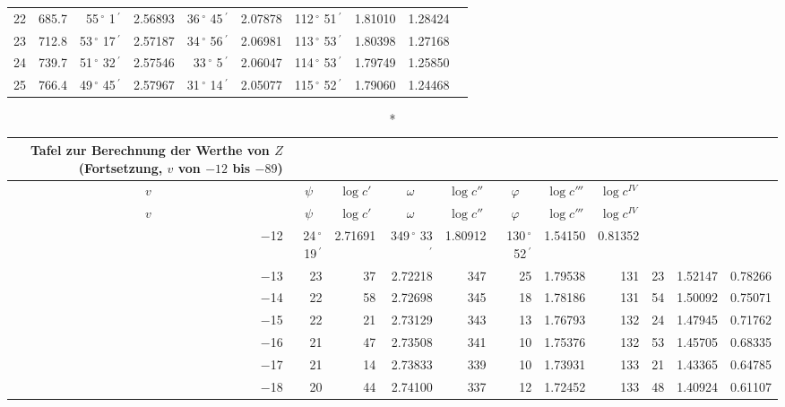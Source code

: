 \documentclass[12pt,a4paper]{article}
\newcommand{\Grad}{\,^\circ}
\newcommand{\Min}{\,^\prime}
\begin{document}
\begin{small}
\begin{longtable}{@{}rr|rr|rr|rr|rr@{}}
22 & 685.7 & 55$\Grad$ 1$\Min$ & 2.56893 & 36$\Grad$ 45$\Min$ & 2.07878 & 112$\Grad$ 51$\Min$ & 1.81010 & 1.28424 \\
23 & 712.8 & 53$\Grad$ 17$\Min$ & 2.57187 & 34$\Grad$ 56$\Min$ & 2.06981 & 113$\Grad$ 53$\Min$ & 1.80398 & 1.27168 \\
24 & 739.7 & 51$\Grad$ 32$\Min$ & 2.57546 & 33$\Grad$ 5$\Min$ & 2.06047 & 114$\Grad$ 53$\Min$ & 1.79749 & 1.25850 \\
25 & 766.4 & 49$\Grad$ 45$\Min$ & 2.57967 & 31$\Grad$ 14$\Min$ & 2.05077 & 115$\Grad$ 52$\Min$ & 1.79060 & 1.24468 \\
\end{longtable}
\end{small}

\newpage

\begin{small}
\noindent\begin{longtable}{@{}r|rr|rr|rr|rr|rr@{}}
\caption*{Tafel zur Berechnung der Werthe von $Z$ (Fortsetzung, $v$ von $-12$ bis $-89$)}\\
\toprule
\multicolumn{1}{c}{$v$} &
\multicolumn{1}{c}{$\psi$} & \multicolumn{1}{c}{$\log c'$} &
\multicolumn{1}{c}{$\omega$} & \multicolumn{1}{c}{$\log c''$} &
\multicolumn{1}{c}{$\varphi$} & \multicolumn{1}{c}{$\log c'''$} &
\multicolumn{1}{c}{$\log c^{IV}$} \\
\midrule
\endfirsthead
\toprule
\multicolumn{1}{c}{$v$} &
\multicolumn{1}{c}{$\psi$} & \multicolumn{1}{c}{$\log c'$} &
\multicolumn{1}{c}{$\omega$} & \multicolumn{1}{c}{$\log c''$} &
\multicolumn{1}{c}{$\varphi$} & \multicolumn{1}{c}{$\log c'''$} &
\multicolumn{1}{c}{$\log c^{IV}$} \\
\midrule
\endhead
\bottomrule
\endfoot
$-$12 & 24$\Grad$ 19$\Min$ & 2.71691 & 349$\Grad$ 33$\Min$ & 1.80912 & 130$\Grad$ 52$\Min$ & 1.54150 & 0.81352 \\
$-$13 & 23 & 37 & 2.72218 & 347 & 25 & 1.79538 & 131 & 23 & 1.52147 & 0.78266 \\
$-$14 & 22 & 58 & 2.72698 & 345 & 18 & 1.78186 & 131 & 54 & 1.50092 & 0.75071 \\
$-$15 & 22 & 21 & 2.73129 & 343 & 13 & 1.76793 & 132 & 24 & 1.47945 & 0.71762 \\
$-$16 & 21 & 47 & 2.73508 & 341 & 10 & 1.75376 & 132 & 53 & 1.45705 & 0.68335 \\
$-$17 & 21 & 14 & 2.73833 & 339 & 10 & 1.73931 & 133 & 21 & 1.43365 & 0.64785 \\
$-$18 & 20 & 44 & 2.74100 & 337 & 12 & 1.72452 & 133 & 48 & 1.40924 & 0.61107 \\

\end{longtable}
\end{small}
\end{document}
